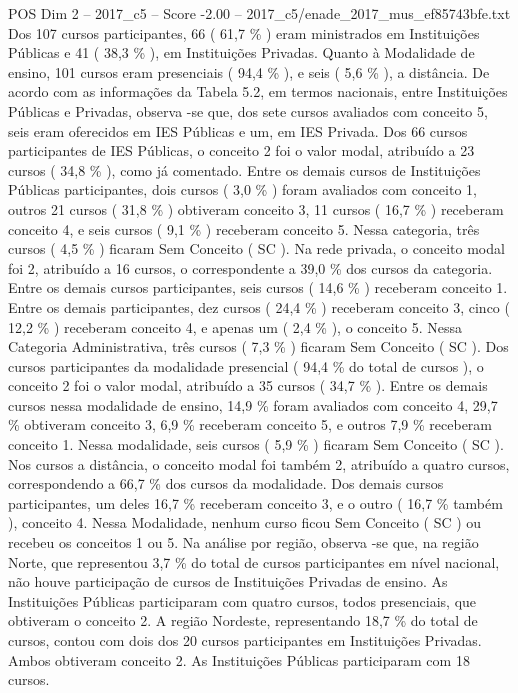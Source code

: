 \begin{textsample}{POS Dim 2 – 2017\_c5 – Score -2.00 – 2017\_c5/enade\_2017\_mus\_ef85743bfe.txt}
Dos 107 cursos participantes, 66 ( 61,7 \% ) eram ministrados em Instituições Públicas e 41 ( 38,3 \% ), em Instituições Privadas.
Quanto à Modalidade de ensino, 101 cursos eram presenciais ( 94,4 \% ), e seis ( 5,6 \% ), a distância.
De acordo com as informações da Tabela 5.2, em termos nacionais, entre Instituições Públicas e Privadas, observa -se que, dos sete cursos avaliados com conceito 5, seis eram oferecidos em IES Públicas e um, em IES Privada.
Dos 66 cursos participantes de IES Públicas, o conceito 2 foi o valor modal, atribuído a 23 cursos ( 34,8 \% ), como já comentado.
Entre os demais cursos de Instituições Públicas participantes, dois cursos ( 3,0 \% ) foram avaliados com conceito 1, outros 21 cursos ( 31,8 \% ) obtiveram conceito 3, 11 cursos ( 16,7 \% ) receberam conceito 4, e seis cursos ( 9,1 \% ) receberam conceito 5.
Nessa categoria, três cursos ( 4,5 \% ) ficaram Sem Conceito ( SC ).
Na rede privada, o conceito modal foi 2, atribuído a 16 cursos, o correspondente a 39,0 \% dos cursos da categoria.
Entre os demais cursos participantes, seis cursos ( 14,6 \% ) receberam conceito 1.
Entre os demais participantes, dez cursos ( 24,4 \% ) receberam conceito 3, cinco ( 12,2 \% ) receberam conceito 4, e apenas um ( 2,4 \% ), o conceito 5.
Nessa Categoria Administrativa, três cursos ( 7,3 \% ) ficaram Sem Conceito ( SC ).
Dos cursos participantes da modalidade presencial ( 94,4 \% do total de cursos ), o conceito 2 foi o valor modal, atribuído a 35 cursos ( 34,7 \% ).
Entre os demais cursos nessa modalidade de ensino, 14,9 \% foram avaliados com conceito 4, 29,7 \% obtiveram conceito 3, 6,9 \% receberam conceito 5, e outros 7,9 \% receberam conceito 1.
Nessa modalidade, seis cursos ( 5,9 \% ) ficaram Sem Conceito ( SC ).
Nos cursos a distância, o conceito modal foi também 2, atribuído a quatro cursos, correspondendo a 66,7 \% dos cursos da modalidade.
Dos demais cursos participantes, um deles 16,7 \% receberam conceito 3, e o outro ( 16,7 \% também ), conceito 4.
Nessa Modalidade, nenhum curso ficou Sem Conceito ( SC ) ou recebeu os conceitos 1 ou 5.
Na análise por região, observa -se que, na região Norte, que representou 3,7 \% do total de cursos participantes em nível nacional, não houve participação de cursos de Instituições Privadas de ensino.
As Instituições Públicas participaram com quatro cursos, todos presenciais, que obtiveram o conceito 2.
A região Nordeste, representando 18,7 \% do total de cursos, contou com dois dos 20 cursos participantes em Instituições Privadas.
Ambos obtiveram conceito 2.
As Instituições Públicas participaram com 18 cursos.

\end{textsample}

